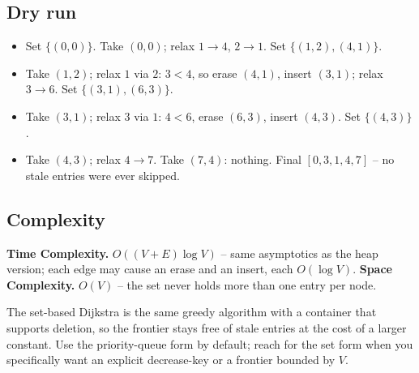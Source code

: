 \subsection*{Dry run}


\begin{itemize}
  \item Set $\{(0,0)\}$. Take $(0,0)$; relax $1\!\to\!4$, $2\!\to\!1$.
        Set $\{(1,2),(4,1)\}$.
  \item Take $(1,2)$; relax $1$ via $2$: $3<4$, so erase $(4,1)$,
        insert $(3,1)$; relax $3\!\to\!6$. Set $\{(3,1),(6,3)\}$.
  \item Take $(3,1)$; relax $3$ via $1$: $4<6$, erase $(6,3)$, insert
        $(4,3)$. Set $\{(4,3)\}$.
  \item Take $(4,3)$; relax $4\!\to\!7$. Take $(7,4)$: nothing.
        Final $[0,3,1,4,7]$ -- no stale entries were ever skipped.
\end{itemize}

\subsection*{Complexity}

\begin{complexitybox}
\textbf{Time Complexity.} $O((V+E)\log V)$ -- same asymptotics as the
heap version; each edge may cause an erase and an insert, each
$O(\log V)$. \textbf{Space Complexity.} $O(V)$ -- the set never holds
more than one entry per node.
\end{complexitybox}

\begin{takeawaybox}
The set-based Dijkstra is the same greedy algorithm with a container
that supports deletion, so the frontier stays free of stale entries at
the cost of a larger constant. Use the priority-queue form by default;
reach for the set form when you specifically want an explicit
decrease-key or a frontier bounded by $V$.
\end{takeawaybox}
